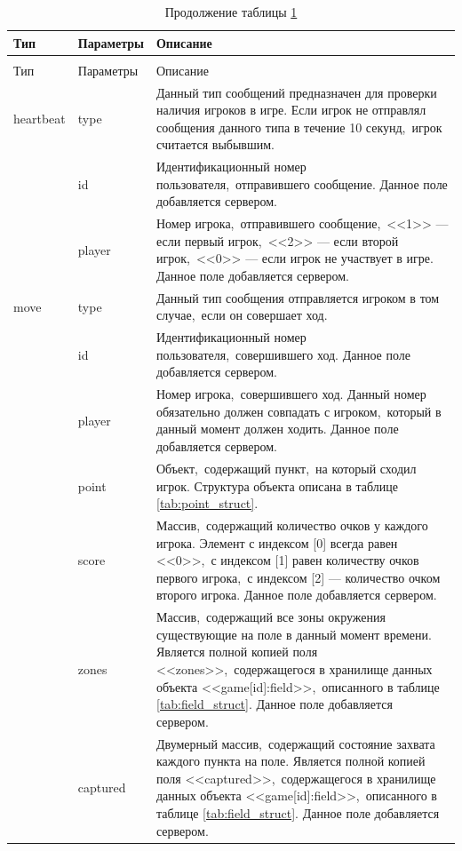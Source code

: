 \documentclass[14pt,a4paper]{report}
\begin{document}
\begin{longtable}{| l | l | p{11cm} |}
\caption{Сообщения,~публикуемые на канале <</game/[channel]>>}
\label{tab:pubsub_game}\\*\hline
Тип & Параметры & Описание\\*\hline
\endfirsthead
\caption*{Продолжение таблицы \ref{tab:pubsub_game}}\\*\hline
Тип & Параметры & Описание\\*\hline
\endhead
heartbeat & type & Данный тип сообщений предназначен для проверки наличия игроков в игре. Если игрок не отправлял сообщения данного типа в течение 10 секунд,~игрок считается выбывшим.\\*\cline{2-3}
 & id & Идентификационный номер пользователя,~отправившего сообщение. Данное поле добавляется сервером.\\*\cline{2-3}
 & player & Номер игрока,~отправившего сообщение,~<<1>> --- если первый игрок,~<<2>> --- если второй игрок,~<<0>> --- если игрок не участвует в игре. Данное поле добавляется сервером.\\*\hline
move & type & Данный тип сообщения отправляется игроком в том случае,~если он совершает ход.\\*\cline{2-3}
 & id & Идентификационный номер пользователя,~совершившего ход. Данное поле добавляется сервером.\\*\cline{2-3}
 & player & Номер игрока,~совершившего ход. Данный номер обязательно должен совпадать с игроком,~который в данный момент должен ходить. Данное поле добавляется сервером.\\*\cline{2-3}
 & point & Объект,~содержащий пункт,~на который сходил игрок. Структура объекта описана в таблице \ref{tab:point_struct}.\\*\cline{2-3}
 & score & Массив,~содержащий количество очков у каждого игрока. Элемент с индексом [0] всегда равен <<0>>,~с индексом [1] равен количеству очков первого игрока,~с индексом [2] --- количество очком второго игрока. Данное поле добавляется сервером.\\*\cline{2-3}
 & zones & Массив,~содержащий все зоны окружения существующие на поле в данный момент времени. Является полной копией поля <<zones>>,~содержащегося в хранилище данных объекта <<game[id]:field>>,~описанного в таблице \ref{tab:field_struct}. Данное поле добавляется сервером.\\*\cline{2-3}
 & captured & Двумерный массив,~содержащий состояние захвата каждого пункта на поле. Является полной копией поля <<captured>>,~содержащегося в хранилище данных объекта <<game[id]:field>>,~описанного в таблице \ref{tab:field_struct}. Данное поле добавляется сервером.\\*\hline

\end{longtable}
\end{document}
